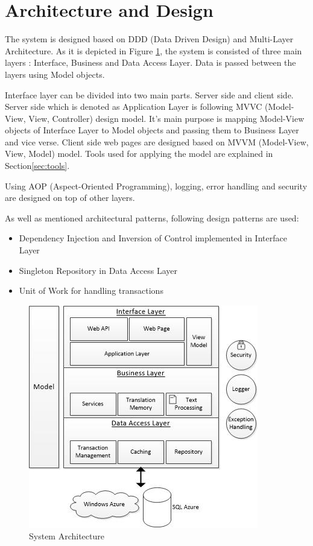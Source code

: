 \section{Architecture and Design}
The system is designed based on DDD (Data Driven Design) and Multi-Layer Architecture. As it is depicted in Figure \ref{fig:architecture}, the system is consisted of three main layers : Interface, Business and Data Access Layer. Data is passed between the layers using Model objects.

Interface layer can be divided into two main parts. Server side and client side. Server side which is denoted as Application Layer is following MVVC (Model-View, View, Controller) design model. It's main purpose is mapping Model-View objects of Interface Layer to Model objects and passing them to Business Layer and vice verse. Client side web pages are designed based on MVVM (Model-View, View, Model) model. Tools used for applying the model are explained in Section\ref{sec:tools}.

Using AOP (Aspect-Oriented Programming), logging, error handling and security are designed on top of other layers.

As well as mentioned architectural patterns, following design patterns are used:
\begin{itemize}
	\item Dependency Injection and Inversion of Control implemented in Interface Layer
	\item Singleton Repository in Data Access Layer
	\item Unit of Work for handling transactions
\end{itemize} 

\begin{figure}[h]
\begin{center}
\includegraphics[scale=0.9]{figures/architecture.jpg}
\caption{System Architecture
\label{fig:architecture}}
\end{center}
\end{figure}